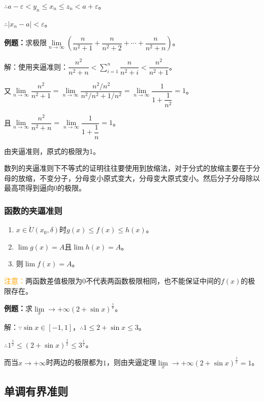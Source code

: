 \documentclass[UTF8, 12pt]{ctexart}
\begin{document}
$\therefore a-\varepsilon<y_n\leqslant x_n\leqslant z_n<a+\varepsilon$。

$\therefore\vert x_n-a\vert<\varepsilon$。

\textbf{例题：}求极限$\lim\limits_{n\to\infty}\left(\dfrac{n}{n^2+1}+\dfrac{n}{n^2+2}+\cdots+\dfrac{n}{n^2+n}\right)$。

解：使用夹逼准则：$\dfrac{n^2}{n^2+n}<\sum_{i=1}^n\dfrac{n}{n^2+i}<\dfrac{n^2}{n^2+1}$。

又$\lim\limits_{n\to\infty}\dfrac{n^2}{n^2+1}=\lim\limits_{n\to\infty}\dfrac{n^2/n^2}{n^2/n^2+1/n^2}=\lim\limits_{n\to\infty}\dfrac{1}{1+\dfrac{1}{n^2}}=1$。

且$\lim\limits_{n\to\infty}\dfrac{n^2}{n^2+n}=\lim\limits_{n\to\infty}\dfrac{1}{1+\dfrac{1}{n}}=1$。

由夹逼准则，原式的极限为1。

数列的夹逼准则下不等式的证明往往要使用到放缩法，对于分式的放缩主要在于分母的放缩，不变分子，分母变小原式变大，分母变大原式变小。然后分子分母除以最高项得到逼向0的极限。

\subsubsection{函数的夹逼准则}

\begin{enumerate}
    \item $x\in\mathring{U}(x_0,\delta)$时$g(x)\leqslant f(x)\leqslant h(x)$。
    \item $\lim g(x)=A$且$\lim h(x)=A$。
    \item 则$\lim f(x)=A$。
\end{enumerate}

\textcolor{orange}{注意：}两函数差值极限为0不代表两函数极限相同，也不能保证中间的$f(x)$的极限存在。

\textbf{例题：}求$\lim\limits_x\to+\infty(2+\sin x)^{\frac{1}{x}}$。

解：$\because \sin x\in[-1,1]$，$\therefore 1\leqslant 2+\sin x\leqslant 3$。

$\therefore 1^{\frac{1}{x}}\leqslant\left(2+\sin x\right)^{\frac{1}{x}}\leqslant 3^{\frac{1}{x}}$。

而当$x\to+\infty$时两边的极限都为$1$，则由夹逼定理$\lim\limits_x\to+\infty(2+\sin x)^{\frac{1}{x}}=1$。

\subsection{单调有界准则}
\end{document}
